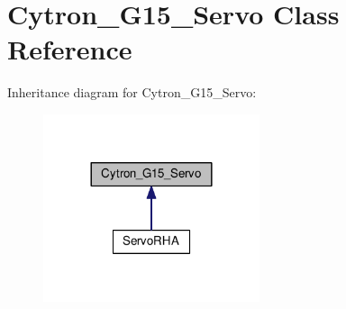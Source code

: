 \hypertarget{classCytron__G15__Servo}{}\section{Cytron\+\_\+\+G15\+\_\+\+Servo Class Reference}
\label{classCytron__G15__Servo}


Inheritance diagram for Cytron\+\_\+\+G15\+\_\+\+Servo\+:\nopagebreak
\begin{figure}[H]
\begin{center}
\leavevmode
\includegraphics[width=180pt]{classCytron__G15__Servo__inherit__graph}
\end{center}
\end{figure}
